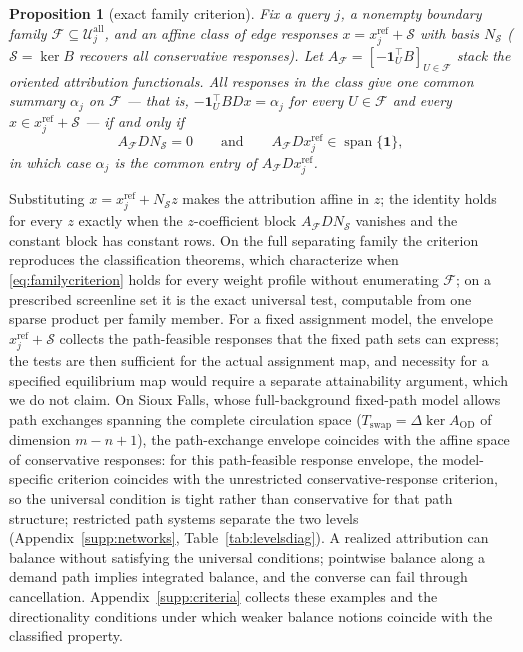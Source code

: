 \documentclass[a4paper,fleqn]{cas-sc}
\newtheorem{proposition}[theorem]{Proposition}
\begin{document}
\begin{proposition}[exact family criterion]\label{prop:familycriterion}
Fix a query $j$, a nonempty boundary family
$\mathcal F\subseteq\mathcal U_j^{\mathrm{all}}$, and an affine class of
edge responses $x=x_j^{\mathrm{ref}}+\mathcal S$ with basis $N_{\mathcal S}$
($\mathcal S=\ker B$ recovers all conservative responses). Let
$A_{\mathcal F}=[-\mathbf 1_U^\top B]_{U\in\mathcal F}$ stack the oriented
attribution functionals. All responses in the class give one common summary
$\alpha_j$ on $\mathcal F$ --- that is,
$-\mathbf 1_U^\top BDx=\alpha_j$ for every $U\in\mathcal F$ and every
$x\in x_j^{\mathrm{ref}}+\mathcal S$ --- if and only if
\begin{equation}
A_{\mathcal F}DN_{\mathcal S}=0
\qquad\text{and}\qquad
A_{\mathcal F}Dx_j^{\mathrm{ref}}\in\operatorname{span}\{\mathbf 1\},
\label{eq:familycriterion}
\end{equation}
in which case $\alpha_j$ is the common entry of $A_{\mathcal F}Dx_j^{\mathrm{ref}}$.
\end{proposition}
Substituting $x=x_j^{\mathrm{ref}}+N_{\mathcal S}z$ makes the attribution
affine in $z$; the identity holds for every $z$ exactly when the
$z$-coefficient block $A_{\mathcal F}DN_{\mathcal S}$ vanishes and the
constant block has constant rows. On the full separating family the
criterion reproduces the classification theorems, which characterize
when \eqref{eq:familycriterion} holds for every weight profile without
enumerating $\mathcal F$; on a prescribed screenline set it is the exact
universal test, computable from one sparse product per family member.
For a fixed assignment model, the envelope
$x_j^{\mathrm{ref}}+\mathcal S$ collects the path-feasible responses
that the fixed path sets can express; the tests are then sufficient
for the actual assignment map, and necessity for a specified
equilibrium map would require a separate attainability argument, which
we do not claim. On Sioux Falls, whose full-background fixed-path
model allows path exchanges spanning the complete circulation space
($T_{\mathrm{swap}}=\Delta\ker A_{\mathrm{OD}}$ of dimension $m-n+1$),
the path-exchange envelope coincides with the affine space of
conservative responses: for this path-feasible response envelope, the
model-specific criterion coincides with the unrestricted
conservative-response criterion, so the universal condition is tight
rather than conservative for that path structure; restricted path
systems separate the two levels (Appendix~\ref{supp:networks},
Table~\ref{tab:levelsdiag}).
A realized attribution can balance without satisfying the universal
conditions; pointwise balance along a demand path implies integrated
balance, and the converse can fail through cancellation.
Appendix~\ref{supp:criteria} collects these examples and the
directionality conditions under which weaker balance notions coincide
with the classified property.
\end{document}
